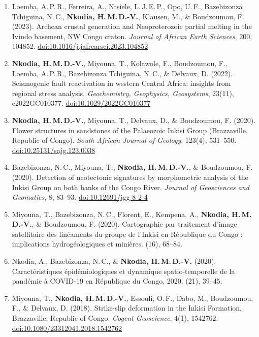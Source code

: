 \documentclass[11pt,a4paper]{article}
\begin{document}
\begin{enumerate}[leftmargin=1.6em, itemsep=3pt, topsep=2pt, label=\arabic*.]
\item Loemba, A.\,P.\,R., Ferreira, A., Ntsiele, L.\,J.\,E.\,P., Opo, U.\,F., Bazebizonza Tchiguina, N.\,C., \textbf{Nkodia, H.\,M.\,D.-V.}, Klausen, M., \& Boudzoumou, F. (2023). Archean crustal generation and Neoproterozoic partial melting in the Ivindo basement, NW Congo craton. \emph{Journal of African Earth Sciences}, 200, 104852. \href{https://doi.org/10.1016/j.jafrearsci.2023.104852}{doi:10.1016/j.jafrearsci.2023.104852}
\item \textbf{Nkodia, H.\,M.\,D.-V.}, Miyouna, T., Kolawole, F., Boudzoumou, F., Loemba, A.\,P.\,R., Bazebizonza Tchiguina, N.\,C., \& Delvaux, D. (2022). Seismogenic fault reactivation in western Central Africa: insights from regional stress analysis. \emph{Geochemistry, Geophysics, Geosystems}, 23(11), e2022GC010377. \href{https://doi.org/10.1029/2022GC010377}{doi:10.1029/2022GC010377}
\item \textbf{Nkodia, H.\,M.\,D.-V.}, Miyouna, T., Delvaux, D., \& Boudzoumou, F. (2020). Flower structures in sandstones of the Palaeozoic Inkisi Group (Brazzaville, Republic of Congo). \emph{South African Journal of Geology}, 123(4), 531–550. \href{https://doi.org/10.25131/sajg.123.0038}{doi:10.25131/sajg.123.0038}
\item Bazebizonza, N.\,C., Miyouna, T., \textbf{Nkodia, H.\,M.\,D.-V.}, \& Boudzoumou, F. (2020). Detection of neotectonic signatures by morphometric analysis of the Inkisi Group on both banks of the Congo River. \emph{Journal of Geosciences and Geomatics}, 8, 83–93. \href{https://doi.org/10.12691/jgg-8-2-4}{doi:10.12691/jgg-8-2-4}
\item Miyouna, T., Bazebizonza, N.\,C., Florent, E., Kempena, A., \textbf{Nkodia, H.\,M.\,D.-V.}, \& Boudzoumou, F. (2020). Cartographie par traitement d'image satellitaire des linéaments du groupe de l'Inkisi en République du Congo : implications hydrogéologiques et minières. (16), 68–84.
\item Nkodia, A., Bazebizonza, N.\,C., \& \textbf{Nkodia, H.\,M.\,D.-V.} (2020). Caractéristiques épidémiologiques et dynamique spatio-temporelle de la pandémie à COVID-19 en République du Congo, 2020. (21), 39–45.
\item Miyouna, T., \textbf{Nkodia, H.\,M.\,D.-V.}, Essouli, O.\,F., Dabo, M., Boudzoumou, F., \& Delvaux, D. (2018). Strike-slip deformation in the Inkisi Formation, Brazzaville, Republic of Congo. \emph{Cogent Geoscience}, 4(1), 1542762. \href{https://doi.org/10.1080/23312041.2018.1542762}{doi:10.1080/23312041.2018.1542762}
\end{enumerate}
\end{document}
